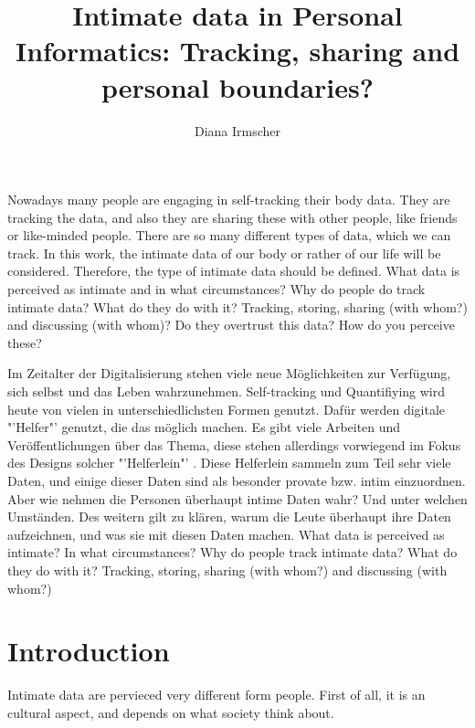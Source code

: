 \documentclass[journal]{vgtc}                %
\title{Intimate data in Personal Informatics: Tracking, sharing and personal boundaries?}
\author{Diana Irmscher}
\begin{document}

\maketitle

%
%
Nowadays many people are engaging in self-tracking their body data. They are tracking the data, and also they are sharing these with other people, like friends or like-minded people. There are so many different types of data, which we can track. In this work, the intimate data of our body or rather of our life will be considered. Therefore, the type of intimate data should be defined. What data is perceived as intimate and in what circumstances?
Why do people do track intimate data?
What do they do with it? Tracking, storing, sharing (with whom?) and discussing (with whom)? Do they overtrust this data? How do you perceive these?

Im Zeitalter der Digitalisierung stehen viele neue Möglichkeiten zur Verfügung, sich selbst und das Leben wahrzunehmen. Self-tracking und Quantifiying wird heute von vielen in unterschiedlichsten Formen genutzt. Dafür werden digitale "'Helfer"' genutzt, die das möglich machen. Es gibt viele Arbeiten und Veröffentlichungen über das Thema, diese stehen allerdings vorwiegend im Fokus des Designs solcher "'Helferlein"' \cite{doi:10.1080/13691058.2014.920528}. Diese Helferlein sammeln zum Teil sehr viele Daten, und einige dieser Daten sind als besonder provate bzw. intim einzuordnen. Aber wie nehmen die Personen überhaupt intime Daten wahr? Und unter welchen Umständen. Des weitern gilt zu klären, warum die Leute überhaupt ihre Daten aufzeichnen, und was sie mit diesen Daten machen.
What data is perceived as intimate? In what circumstances?
Why do people track intimate data?
What do they do with it? Tracking, storing, sharing (with
whom?) and discussing (with whom?)


\section{Introduction}
Intimate data are pervieced very different form people. First of all, it is an cultural aspect, and depends on what society think about.
\end{document}
